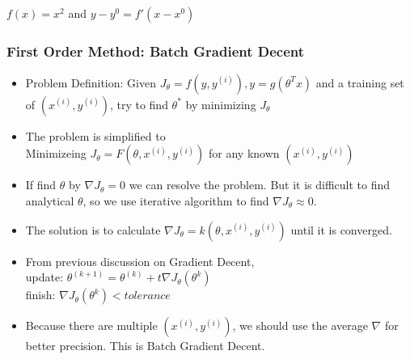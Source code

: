 \begin{frame}[c]
	\centering 
	\\$f(x)=x^2$ and $y-y^0=f'(x-x^0)$
\end{frame}
\begin{frame}
\frametitle{First Order Method: Batch Gradient Decent}
	\small
	\begin{itemize}
		\item Problem Definition: Given $J_{\theta}=f(y,y^{(i)}),y=g(\theta ^Tx)$ and a training set of ${(x^{(i)},y^{(i)})}$, try to find $\theta^*$ by minimizing $J_{\theta}$
		\item The problem is simplified to \\
		\hspace{1cm}Minimizeing $J_{\theta}=F(\theta,x^{(i)},y^{(i)})$ for any known $(x^{(i)},y^{(i)})$ 
		\item If find $\theta$ by $\nabla J_{\theta}=0$ we can resolve the problem. But it is difficult to find analytical $\theta$, so we use iterative algorithm to find $\nabla J_{\theta}\approx 0$.
		\item The solution is to calculate $\nabla J_{\theta}=k(\theta,x^{(i)},y^{(i)})$ until it is converged.
		\item From previous discussion on Gradient Decent,\\
		\hspace{1cm} update: $\theta^{(k+1)}=\theta^{(k)}+t\nabla J_{\theta}(\theta^k)$\\
		\hspace{1cm} finish: $\nabla J_{\theta}(\theta^k)  < tolerance$ 
		\item Because there are multiple $(x^{(i)},y^{(i)})$, we should use the average $\nabla$ for better precision. This is Batch Gradient Decent.
	\end{itemize}
\end{frame}
